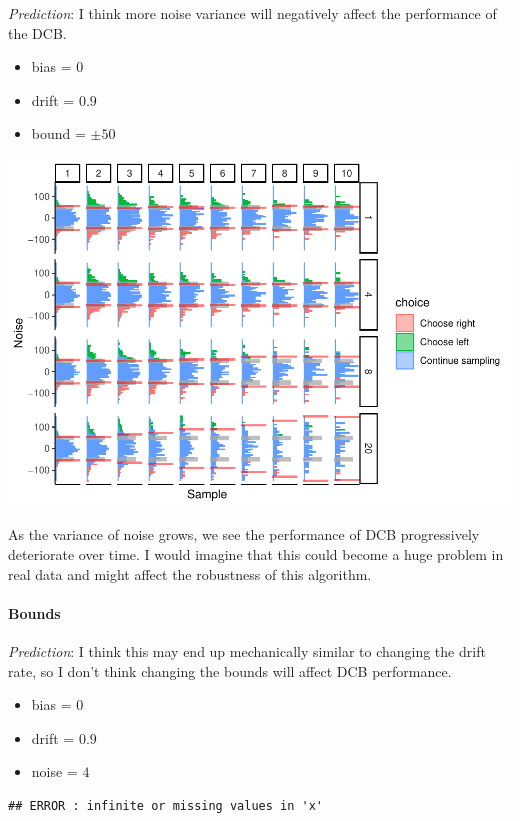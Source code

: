 \documentclass[
]{book}
\providecommand{\tightlist}{%
  \setlength{\itemsep}{0pt}\setlength{\parskip}{0pt}}
\begin{document}
\emph{Prediction}: I think more noise variance will negatively affect the performance of the DCB.

\begin{itemize}
\tightlist
\item
  bias = \(0\)
\item
  drift = \(0.9\)
\item
  bound = \(\pm 50\)
\end{itemize}

\includegraphics{LateNightBayes_files/figure-latex/unnamed-chunk-8-1.pdf}

As the variance of noise grows, we see the performance of DCB progressively deteriorate over time. I would imagine that this could become a huge problem in real data and might affect the robustness of this algorithm.

\hypertarget{bounds}{%
\paragraph*{Bounds}\label{bounds}}

\emph{Prediction}: I think this may end up mechanically similar to changing the drift rate, so I don't think changing the bounds will affect DCB performance.

\begin{itemize}
\tightlist
\item
  bias = \(0\)
\item
  drift = \(0.9\)
\item
  noise = \(4\)
\end{itemize}

\begin{verbatim}
## ERROR : infinite or missing values in 'x'
\end{verbatim}
\end{document}
